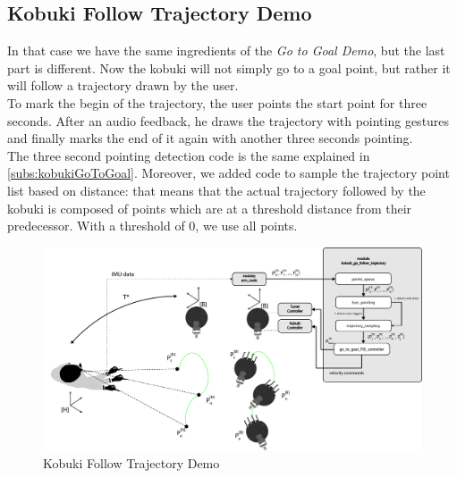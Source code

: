 \subsection{Kobuki Follow Trajectory Demo}
In that case we have the same ingredients of the \emph{Go to Goal Demo}, but the last part is different. Now the kobuki will not simply go to a goal point, but rather it will follow a trajectory drawn by the user.\\
To mark the begin of the trajectory, the user points the start point for three seconds. After an audio feedback, he draws the trajectory with pointing gestures and finally marks the end of it again with another three seconds pointing.\\
The three second pointing detection code is the same explained in \ref{subs:kobukiGoToGoal}. Moreover, we added code to sample the trajectory point list based on distance: that means that the actual trajectory followed by the kobuki is composed of points which are at a threshold distance from their predecessor. With a threshold of $0$, we use all points.
\begin{figure}
	\centering
	\includegraphics[width=.9\textwidth]{img/followTrajectorySW.png}%
	\caption{Kobuki Follow Trajectory Demo}
	\label{fig:followTrajectoryDemo}
\end{figure}
